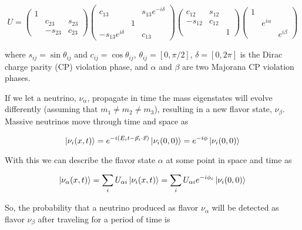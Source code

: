 \begin{equation}	
	U = 
	\begin{pmatrix}
		1 & & \\
		& c_{23} & s_{23} \\
		& -s_{23} & c_{23}
	\end{pmatrix}
	\begin{pmatrix}
		c_{13} & & s_{13}e^{-i\delta} \\
		& 1 &	\\
		-s_{13}e^{i\delta} & & c_{13}
	\end{pmatrix}
	\begin{pmatrix}
		c_{12} & s_{12} & \\
		-s_{12} & c_{12} & \\
		& & 1
	\end{pmatrix}
	\begin{pmatrix}
		1 & & \\
		& e^{i\alpha}  & \\
		& & e^{i\beta}
	\end{pmatrix}
\end{equation}

where $s_{ij} = \sin\theta_{ij}$ and $c_{ij} = \cos\theta_{ij}$, $\theta_{ij} = [0,\pi/2]$,
$\delta = [0,2\pi]$ is the Dirac charge parity (CP) violation phase, and $\alpha$ and $\beta$ are two Majorana CP violation phases.

If we let a neutrino, $\nu_\alpha$, propagate in time the mass eigenstates will evolve differently (assuming that $m_{1} \neq m_{2} \neq m_{3}$), resulting in a new flavor state, $\nu_{\beta}$.
Massive neutrinos move through time and space as

\begin{equation}
	\ket{\nu_i(x,t)} = e^{-i(E_{i}t-\vec{p}_{i}\cdot\vec{x})}\ket{\nu_i(0,0)} = e^{-i\phi}\ket{\nu_i(0,0)} 
\end{equation}

With this we can describe the flavor state $\alpha$ at some point in space and time as

\begin{equation}
	\ket{\nu_{\alpha}(x,t)} = \sum_{i}U_{\alpha i}\ket{\nu_{i}(x,t)} = \sum_{i}U_{\alpha i}e^{-i\phi_{i}}\ket{\nu_{i}(0,0)}
\end{equation}

So, the probability that a neutrino produced as flavor $\nu_\alpha$ will be detected as flavor $\nu_\beta$ after traveling for a period of time is 

